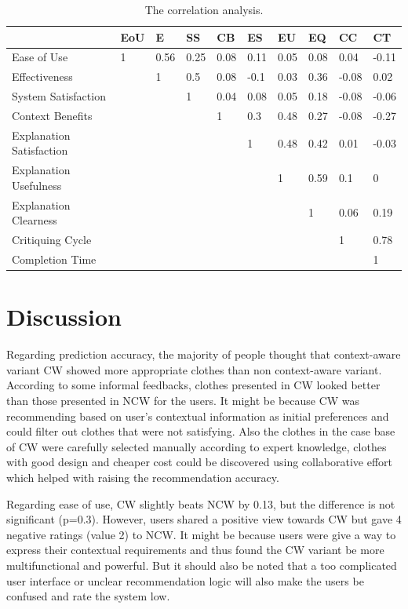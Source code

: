 \begin{table}[H]
	\centering
	\caption{The correlation analysis.}
	\label{tab:correlation}
	\begin{tabular}{p{0.9in}p{0.35in}p{0.35in}p{0.35in}p{0.35in}p{0.35in}p{0.35in}p{0.35in}p{0.35in}p{0.35in}}
		 & EoU & E & SS & CB & ES & EU & EQ & CC & CT \\ \hline
		Ease of Use & 1 & 0.56 & 0.25 & 0.08 & 0.11 & 0.05 & 0.08 & 0.04 & -0.11 \\
		Effectiveness &  & 1 & 0.5 & 0.08 & -0.1 & 0.03 & 0.36 & -0.08 & 0.02 \\
		System Satisfaction &  &  & 1 & 0.04 & 0.08 & 0.05 & 0.18 & -0.08 & -0.06 \\
		Context Benefits &  &  &  & 1 & 0.3 & 0.48 & 0.27 & -0.08 & -0.27 \\
		Explanation Satisfaction &  &  &  &  & 1 & 0.48 & 0.42 & 0.01 & -0.03 \\
		Explanation Usefulness &  &  &  &  &  & 1 & 0.59 & 0.1 & 0 \\
		Explanation Clearness &  &  &  &  &  &  & 1 & 0.06 & 0.19 \\
		Critiquing Cycle &  &  &  &  &  &  &  & 1 & 0.78 \\
		Completion Time &  &  &  &  &  &  &  &  & 1 \\ \hline
	\end{tabular}
\end{table}

\section{Discussion} \label{sec:discussion}

Regarding prediction accuracy, the majority of people thought that context-aware variant CW showed more appropriate clothes than non context-aware variant. According to some informal feedbacks, clothes presented in CW looked better than those presented in NCW for the users. It might be because CW was recommending based on user's contextual information as initial preferences and could filter out clothes that were not satisfying. Also the clothes in the case base of CW were carefully selected manually according to expert knowledge, clothes with good design and cheaper cost could be discovered using collaborative effort which helped with raising the recommendation accuracy.

Regarding ease of use, CW slightly beats NCW by 0.13, but the difference is not significant (p=0.3). However, users shared a positive view towards CW but gave 4 negative ratings (value 2) to NCW. It might be because users were give a way to express their contextual requirements and thus found the CW variant be more multifunctional and powerful. But it should also be noted that a too complicated user interface or unclear recommendation logic will also make the users be confused and rate the system low.

